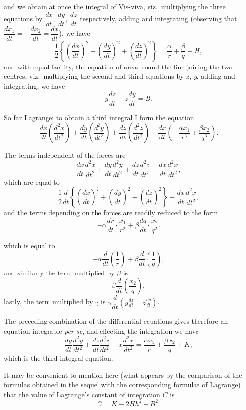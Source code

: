 \documentclass[11pt,a4paper]{book}
\begin{document}
\newpage
[182]

and we obtain at once the integral of Vis-viva, viz.\ multiplying the three equations by $\dfrac{dx}{dt}$, $\dfrac{dy}{dt}$, $\dfrac{dz}{dt}$ respectively, adding and integrating (observing that $\dfrac{dx_1}{dt} = -\dfrac{dx_2}{dt} = \dfrac{dx}{dt}$), we have
\[
\frac{1}{2}\left\{\left(\frac{dx}{dt}\right)^2 + \left(\frac{dy}{dt}\right)^2 + \left(\frac{dz}{dt}\right)^2\right\} = \frac{\alpha}{r} + \frac{\beta}{q} + H, \tag{1, $a$}
\]
and with equal facility, the equation of areas round the line joining the two centres, viz.\ multiplying the second and third equations by $z$, $y$, adding and integrating, we have
\[
y\frac{dz}{dt} - z\frac{dy}{dt} = B. \tag{2, $a$}
\]

So far Lagrange: to obtain a third integral I form the equation
\[
\frac{dx}{dt}\left(\frac{d^2x}{dt^2}\right) + \frac{dy}{dt}\left(\frac{d^2y}{dt^2}\right) + \frac{dz}{dt}\left(\frac{d^2z}{dt^2}\right) - \frac{dx}{dt}\left(-\frac{\alpha x_1}{r^3} + \frac{\beta x_2}{q^3}\right).
\]

The terms independent of the forces are
\[
\frac{dx}{dt}\frac{d^2x}{dt^2} + \frac{dy}{dt}\frac{d^2y}{dt^2} + \frac{dz}{dt}\frac{d^2z}{dt^2} - \frac{dx}{dt}\frac{d^2x}{dt^2},
\]
which are equal to
\[
\frac{1}{2}\frac{d}{dt}\left\{\left(\frac{dx}{dt}\right)^2 + \left(\frac{dy}{dt}\right)^2 + \left(\frac{dz}{dt}\right)^2\right\} - \frac{dx}{dt}\frac{d^2x}{dt^2},
\]
and the terms depending on the forces are readily reduced to the form
\[
-\alpha\frac{dr}{dt} \cdot \frac{x_1}{r^2} + \beta\frac{dq}{dt} \cdot \frac{x_2}{q^2}.
\]

\newpage
[182]

which is equal to
\[
-\alpha\frac{d}{dt}\left(\frac{1}{r}\right) + \beta\frac{d}{dt}\left(\frac{1}{q}\right),
\]
and similarly the term multiplied by $\beta$ is
\[
\beta\frac{d}{dt}\left(\frac{x_2}{q}\right),
\]
lastly, the term multiplied by $\gamma$ is $\gamma\dfrac{d}{dt}(y\tfrac{dz}{dt} - z\tfrac{dy}{dt})$.

The preceding combination of the differential equations gives therefore an equation integrable \textit{per se}, and effecting the integration we have
\[
\frac{dy}{dt}\frac{d^2y}{dt^2} + \frac{dz}{dt}\frac{d^2z}{dt^2} - x\frac{d^2x}{dt^2} = \frac{\alpha x_1}{r} + \frac{\beta x_2}{q} + K,
\]
which is the third integral equation.

It may be convenient to mention here (what appears by the comparison of the formulas obtained in the sequel with the corresponding formulae of Lagrange) that the value of Lagrange's constant of integration $C$ is
\[
C = K - 2Hh^2 - B^2.
\]
\end{document}
